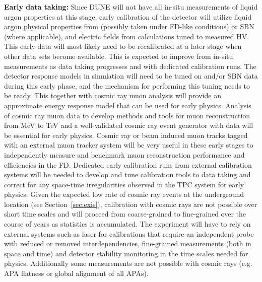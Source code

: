 \textbf{Early data taking:} Since DUNE will not have all in-situ measurements of liquid argon properties at this stage, early calibration of the detector will utilize liquid argon physical properties from  (possibly taken under FD-like conditions) or SBN (where applicable), and electric fields from calculations tuned to measured HV. This early data will most likely need to be recalibrated at a later stage when other data sets become available. This is expected to improve from in-situ measurements as data taking progresses and with dedicated calibration runs. The detector response models in simulation will need to be tuned on  and\slash or SBN data during this early phase, and the mechanism for performing this tuning needs to be ready. This together with cosmic ray muon analysis will provide an approximate energy response model that can be used for early physics. Analysis of cosmic ray muon data to develop methods and tools for muon reconstruction from MeV to TeV and a well-validated cosmic ray event generator with data will be essential for early physics. Cosmic ray or beam induced muon tracks tagged with an external muon tracker system will be very useful in these early stages to independently measure and benchmark muon reconstruction performance and efficiencies in the FD. Dedicated early calibration runs from external calibration systems will be needed to develop and tune calibration tools to data taking and correct for any space-time irregularities observed in the TPC system for early physics. Given the expected low rate of cosmic ray events at the underground location (see Section~\ref{sec:exis}), calibration with cosmic rays are not possible over short time scales and will proceed from coarse-grained to fine-grained over the course of years as statistics is accumulated. The experiment will have to rely on external systems such as laser for calibrations that require an independent probe with reduced or removed interdependencies, fine-grained measurements (both in space and time) and detector stability monitoring in the time scales needed for physics. Additionally some measurements are not possible with cosmic rays (e.g. APA flatness or global alignment of all APAs). 

